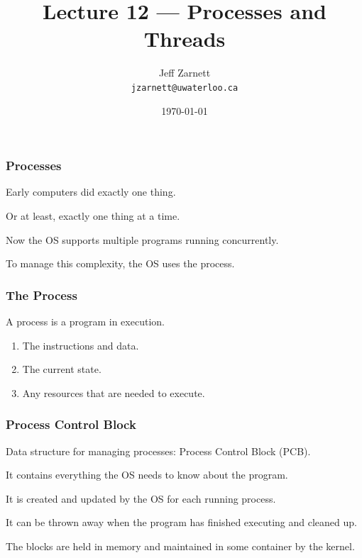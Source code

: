 


\title{Lecture 12 --- Processes and Threads }

\author{Jeff Zarnett \\ \small \texttt{jzarnett@uwaterloo.ca}}
\date{\today}



\begin{frame}
  \titlepage
\end{frame}

\begin{frame}
	\frametitle{Processes}


	Early computers did exactly one thing.

	Or at least, exactly one thing at a time.

	Now the OS supports multiple programs running concurrently.

	To manage this complexity, the OS uses the \alert{process}.

\end{frame}

\begin{frame}
	\frametitle{The Process}

	A process is a program in execution.

	\begin{enumerate}
		\item The instructions and data.
		\item The current state.
		\item Any resources that are needed to execute.
	\end{enumerate}

\end{frame}

\begin{frame}
	\frametitle{Process Control Block}

	Data structure for managing processes: \alert{Process Control Block} (PCB).

	It contains everything the OS needs to know about the program.

	It is created and updated by the OS for each running process.

	It can be thrown away when the program has finished executing and cleaned up.

	The blocks are held in memory and maintained in some container by the kernel.


\end{frame}

